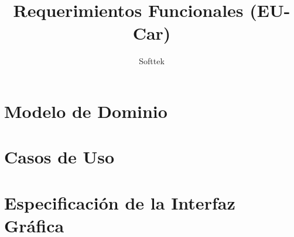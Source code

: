 \documentclass[10pt, letterpaper]{report}
\begin{document}
\title{Requerimientos Funcionales (EU-Car)}
\author{Softtek}
\date{}
\maketitle

\pagestyle{plain}
\tableofcontents

\pagestyle{fancy}
\fancyhf{}
\fancyhead[OC]{\leftmark}
\fancyhead[EC]{\rightmark}
\cfoot{\thepage}

\chapter{Modelo de Dominio}
\clearpage


\chapter{Casos de Uso}
\clearpage

\clearpage


\chapter{Especificación de la Interfaz Gráfica}
\clearpage


\printglossary
\end{document}
